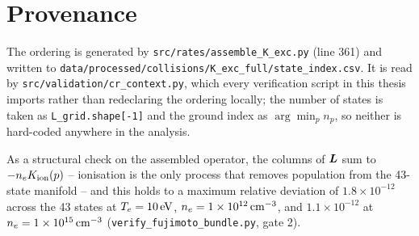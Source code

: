 \section{Provenance}

The ordering is generated by \texttt{src/rates/assemble\_K\_exc.py} (line 361)
and written to
\texttt{data/processed/collisions/K\_exc\_full/state\_index.csv}. It is read by
\texttt{src/validation/cr\_context.py}, which every verification script in this
thesis imports rather than redeclaring the ordering locally; the number of
states is taken as \texttt{L\_grid.shape[-1]} and the ground index as
$\arg\min_p n_p$, so neither is hard-coded anywhere in the analysis.

As a structural check on the assembled operator, the columns of $\bm{L}$ sum to
$-n_e K_{\mathrm{ion}}(p)$ -- ionisation is the only process that removes
population from the 43-state manifold -- and this holds to a maximum relative
deviation of $1.8\times10^{-12}$ across the 43 states at
$T_e = \SI{10}{\electronvolt}$, $n_e = \SI{1e12}{\per\cubic\centi\metre}$, and
$1.1\times10^{-12}$ at $n_e = \SI{1e15}{\per\cubic\centi\metre}$
(\texttt{verify\_fujimoto\_bundle.py}, gate 2).
